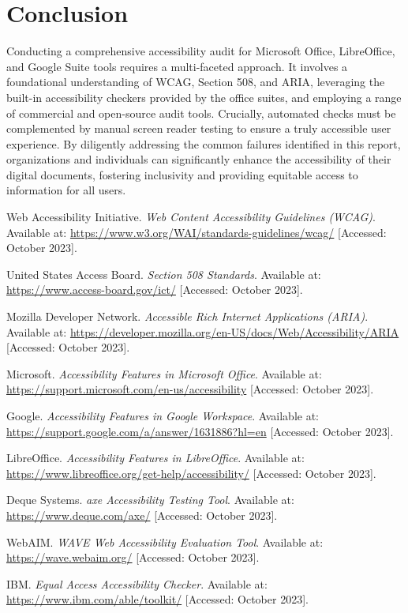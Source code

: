 \section{Conclusion}

Conducting a comprehensive accessibility audit for Microsoft Office, LibreOffice, and Google Suite tools requires a multi-faceted approach. It involves a foundational understanding of WCAG, Section 508, and ARIA, leveraging the built-in accessibility checkers provided by the office suites, and employing a range of commercial and open-source audit tools. Crucially, automated checks must be complemented by manual screen reader testing to ensure a truly accessible user experience. By diligently addressing the common failures identified in this report, organizations and individuals can significantly enhance the accessibility of their digital documents, fostering inclusivity and providing equitable access to information for all users.


\begin{thebibliography}{99}

 Web Accessibility Initiative. \textit{Web Content Accessibility Guidelines (WCAG)}. Available at: \url{https://www.w3.org/WAI/standards-guidelines/wcag/} [Accessed: October 2023].

 United States Access Board. \textit{Section 508 Standards}. Available at: \url{https://www.access-board.gov/ict/} [Accessed: October 2023].

 Mozilla Developer Network. \textit{Accessible Rich Internet Applications (ARIA)}. Available at: \url{https://developer.mozilla.org/en-US/docs/Web/Accessibility/ARIA} [Accessed: October 2023].

 Microsoft. \textit{Accessibility Features in Microsoft Office}. Available at: \url{https://support.microsoft.com/en-us/accessibility} [Accessed: October 2023].

 Google. \textit{Accessibility Features in Google Workspace}. Available at: \url{https://support.google.com/a/answer/1631886?hl=en} [Accessed: October 2023].

 LibreOffice. \textit{Accessibility Features in LibreOffice}. Available at: \url{https://www.libreoffice.org/get-help/accessibility/} [Accessed: October 2023].

 Deque Systems. \textit{axe Accessibility Testing Tool}. Available at: \url{https://www.deque.com/axe/} [Accessed: October 2023].

 WebAIM. \textit{WAVE Web Accessibility Evaluation Tool}. Available at: \url{https://wave.webaim.org/} [Accessed: October 2023].

 IBM. \textit{Equal Access Accessibility Checker}. Available at: \url{https://www.ibm.com/able/toolkit/} [Accessed: October 2023].

\end{thebibliography}
